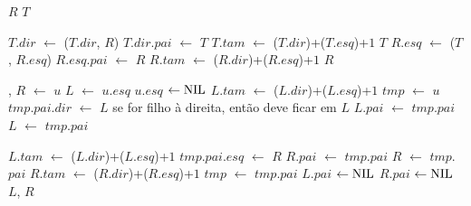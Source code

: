 \begin{algorithm}
\caption{\treapJoin($T$, $R$)}
\label{Algo:TREAPjoin}
\begin{algorithmic}[1]
 \Return $R$
\EndIf
{} \Return $T$
\EndIf

  \State $T$.$dir$ $\gets$ \treapJoin($T$.$dir$, $R$)
  \State $T$.$dir$.$pai$ $\gets$ $T$
  \State $T$.$tam$ $\gets$ \treapGetSize($T$.$dir$)+\treapGetSize($T$.$esq$)+$1$
  \State \Return $T$
\Else 
  \State $R$.$esq$ $\gets$ \treapJoin($T$, $R$.$esq$)
  \State $R$.$esq$.$pai$ $\gets$ $R$
  \State $R$.$tam$ $\gets$ \treapGetSize($R$.$dir$)+\treapGetSize($R$.$esq$)+$1$
  \State \Return $R$
\EndIf
\end{algorithmic}
\end{algorithm}
\begin{algorithm}
\caption{\treapSplit($u$)}
\label{Algo:TREAPsplit}
\begin{algorithmic}[1]
 \Return \Nil, \Nil
\EndIf
\State $R$ $\gets $ $u$
\State $L$ $\gets $ $u$.$esq$
\State $u$.$esq$ $\gets\text{NIL}$
 $L$.$tam$ $\gets$ \treapGetSize($L$.$dir$)+\treapGetSize($L$.$esq$)+$1$
\EndIf
\State $tmp$ $\gets$ $u$
    \State $tmp$.$pai$.$dir$ $\gets$ $L$ \Comment se for filho à direita, então deve ficar em $L$
     $L$.$pai$ $\gets$ $tmp$.$pai$
    \EndIf
    \State $L$ $\gets$ $tmp$.$pai$

    \State $L$.$tam$ $\gets$ \treapGetSize($L$.$dir$)+\treapGetSize($L$.$esq$)+$1$
  \Else
    \State $tmp$.$pai$.$esq$ $\gets$ $R$
     $R$.$pai$ $\gets$ $tmp$.$pai$
    \EndIf
    \State $R$ $\gets$ $tmp$.$pai$
    \State $R$.$tam$ $\gets$ \treapGetSize($R$.$dir$)+\treapGetSize($R$.$esq$)+$1$
  \EndIf
  \State $tmp$ $\gets$ $tmp$.$pai$
\EndWhile
{} $L$.$pai$ $\gets\text{NIL}$\EndIf
{} $R$.$pai$ $\gets\text{NIL}$\EndIf
\State\Return $L$, $R$
\end{algorithmic}
\end{algorithm}



